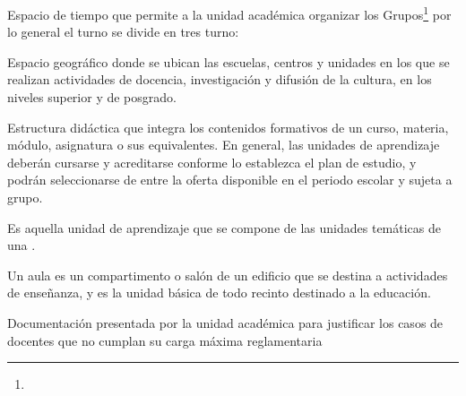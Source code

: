 \begin{bGlosario}
	
	 Espacio de tiempo que permite a la unidad académica organizar los Grupos\footnote{} por lo general el turno se divide en tres turno:\\
	\begin{Titemize}
		\Titem [Matutino]
		\Titem [Vespertino]
		\Titem [Mixto]
	\end{Titemize}

	 Espacio geográfico donde se ubican las escuelas, centros y unidades en los que se realizan actividades de docencia, investigación y difusión de la cultura, en los niveles superior y de posgrado.

	 Estructura didáctica que integra los contenidos formativos de un curso, materia, módulo, asignatura o sus equivalentes. En general, las unidades de aprendizaje deberán cursarse y acreditarse conforme lo establezca el plan de estudio, y podrán seleccionarse de entre la oferta disponible en el periodo escolar y sujeta a grupo. %
	
	 Es aquella unidad de aprendizaje que se compone de las unidades temáticas de una .

	 Un aula es un compartimento o salón de un edificio que se destina a actividades de enseñanza, y es la unidad básica de todo recinto destinado a la educación.	
		
	 Documentación presentada por la unidad académica para justificar los casos de docentes que no cumplan su carga máxima reglamentaria
\end{bGlosario}
